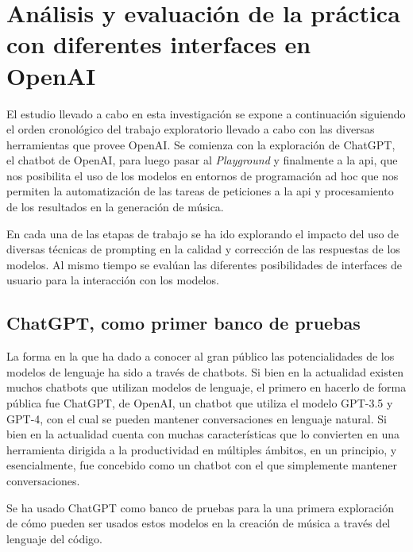 
\chapter{Análisis y evaluación de la práctica con diferentes interfaces en OpenAI}



El estudio llevado a cabo en esta investigación se expone a continuación siguiendo el orden cronológico del trabajo exploratorio llevado a cabo con las diversas herramientas que provee OpenAI. Se comienza con la exploración de ChatGPT, el chatbot de OpenAI, para luego pasar al \emph{Playground} y finalmente a la \gls{api}, que nos posibilita el uso de los modelos en entornos de programación ad hoc que nos permiten la automatización de las tareas de peticiones a la \gls{api} y procesamiento de los resultados en la generación de música.

En cada una de las etapas de trabajo se ha ido explorando el impacto del uso de diversas técnicas de {prompting} en la calidad y corrección de las respuestas de los modelos. Al mismo tiempo se evalúan las diferentes posibilidades de interfaces de usuario para la interacción con los modelos. 

\section{ChatGPT, como primer banco de pruebas}
La forma en la que ha dado a conocer al gran público las potencialidades de los modelos de lenguaje ha sido a través de chatbots. Si bien en la actualidad existen muchos chatbots que utilizan modelos de lenguaje, el primero en hacerlo de forma pública fue ChatGPT, de OpenAI, un chatbot que utiliza el modelo GPT-3.5 y GPT-4, con el cual se pueden mantener conversaciones en lenguaje natural. Si bien en la actualidad cuenta con muchas características que lo convierten en una herramienta dirigida a la productividad en múltiples ámbitos, en un principio, y esencialmente, fue concebido como un chatbot con el que simplemente mantener conversaciones.

Se ha usado ChatGPT como banco de pruebas para la una primera exploración de cómo pueden ser usados estos modelos en la creación de música a través del lenguaje del código.

